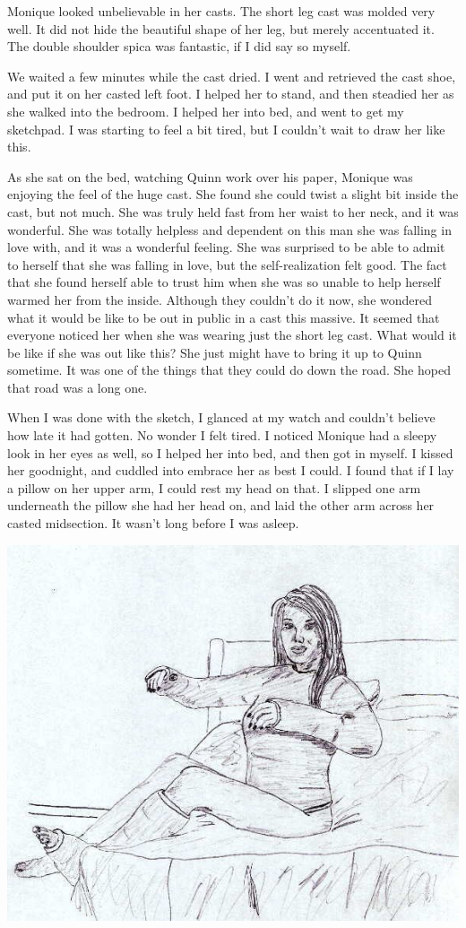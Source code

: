 Monique looked unbelievable in her casts. The short leg cast was molded very well. It did
not hide the beautiful shape of her leg, but merely accentuated it. The double shoulder spica
was fantastic, if I did say so myself.

We waited a few minutes while the cast dried. I went and retrieved the cast shoe, and put
it on her casted left foot. I helped her to stand, and then steadied her as she walked into the
bedroom. I helped her into bed, and went to get my sketchpad. I was starting to feel a bit
tired, but I couldn't wait to draw her like this.

\begin{thought}
As she sat on the bed, watching Quinn work over his paper, Monique was enjoying the feel of
the huge cast. She found she could twist a slight bit inside the cast, but not much. She was
truly held fast from her waist to her neck, and it was wonderful. She was totally helpless and
dependent on this man she was falling in love with, and it was a wonderful feeling. She was
surprised to be able to admit to herself that she was falling in love, but the self-realization
felt good. The fact that she found herself able to trust him when she was so unable to help
herself warmed her from the inside. Although they couldn't do it now, she wondered what it would
be like to be out in public in a cast this massive. It seemed that everyone noticed her when she
was wearing just the short leg cast. What would it be like if she was out like this? She just
might have to bring it up to Quinn sometime. It was one of the things that they could do down
the road. She hoped that road was a long one.
\end{thought}

When I was done with the sketch, I glanced at my watch and couldn't believe how late it had
gotten. No wonder I felt tired. I noticed Monique had a sleepy look in her eyes as well, so I
helped her into bed, and then got in myself. I kissed her goodnight, and cuddled into embrace
her as best I could. I found that if I lay a pillow on her upper arm, I could rest my head on
that. I slipped one arm underneath the pillow she had her head on, and laid the other arm across
her casted midsection. It wasn't long before I was asleep.

\newpage
\begin{center}
\includegraphics{images/kicks30.jpg}
\end{center}
